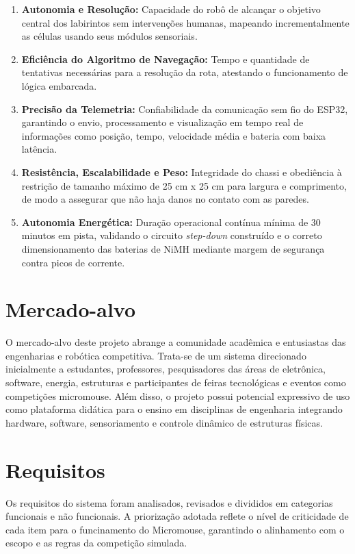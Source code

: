 \begin{enumerate}
    \item \textbf{Autonomia e Resolução:} Capacidade do robô de alcançar o objetivo central dos labirintos sem intervenções humanas, mapeando incrementalmente as células usando seus módulos sensoriais.
    \item \textbf{Eficiência do Algoritmo de Navegação:} Tempo e quantidade de tentativas necessárias para a resolução da rota, atestando o funcionamento de lógica embarcada.
    \item \textbf{Precisão da Telemetria:} Confiabilidade da comunicação sem fio do ESP32, garantindo o envio, processamento e visualização em tempo real de informações como posição, tempo, velocidade média e bateria com baixa latência. 
    \item \textbf{Resistência, Escalabilidade e Peso:} Integridade do chassi e obediência à restrição de tamanho máximo de 25 cm x 25 cm para largura e comprimento, de modo a assegurar que não haja danos no contato com as paredes. 
    \item \textbf{Autonomia Energética:} Duração operacional contínua mínima de 30 minutos em pista, validando o circuito \textit{step-down} construído e o correto dimensionamento das baterias de NiMH mediante margem de segurança contra picos de corrente.
\end{enumerate}

\section{Mercado-alvo}

O mercado-alvo deste projeto abrange a comunidade acadêmica e entusiastas das engenharias e robótica competitiva. Trata-se de um sistema direcionado inicialmente a estudantes, professores, pesquisadores das áreas de eletrônica, software, energia, estruturas e participantes de feiras tecnológicas e eventos como competições micromouse.
Além disso, o projeto possui potencial expressivo de uso como plataforma didática para o ensino em disciplinas de engenharia integrando hardware, software, sensoriamento e controle dinâmico de estruturas físicas.

\section{Requisitos}

Os requisitos do sistema foram analisados, revisados e divididos em categorias funcionais e não funcionais. A priorização adotada reflete o nível de criticidade de cada item para o funcinamento do Micromouse, garantindo o alinhamento com o escopo e as regras da competição simulada.

